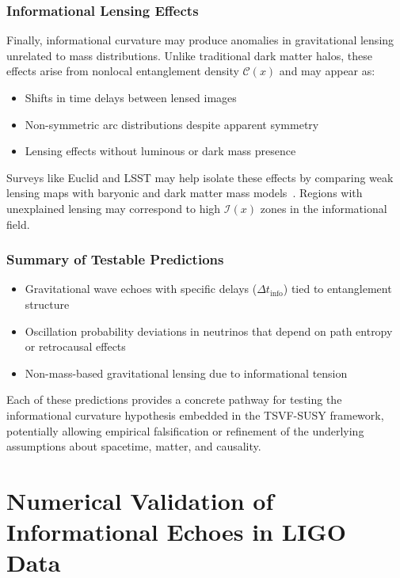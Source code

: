 \documentclass[twocolumn,superscriptaddress,floatfix]{revtex4-2}
\begin{document}
\subsubsection{Informational Lensing Effects}

Finally, informational curvature may produce anomalies in gravitational lensing unrelated to mass distributions. Unlike traditional dark matter halos, these effects arise from nonlocal entanglement density $\mathcal{C}(x)$ and may appear as:
\begin{itemize}
    \item Shifts in time delays between lensed images
    \item Non-symmetric arc distributions despite apparent symmetry
    \item Lensing effects without luminous or dark mass presence
\end{itemize}

Surveys like Euclid and LSST may help isolate these effects by comparing weak lensing maps with baryonic and dark matter mass models~\cite{LSST2009, Euclid2011}. Regions with unexplained lensing may correspond to high $\mathcal{I}(x)$ zones in the informational field.

\subsubsection{Summary of Testable Predictions}

\begin{itemize}
    \item Gravitational wave echoes with specific delays ($\Delta t_{\text{info}}$) tied to entanglement structure
    \item Oscillation probability deviations in neutrinos that depend on path entropy or retrocausal effects
    \item Non-mass-based gravitational lensing due to informational tension
\end{itemize}

Each of these predictions provides a concrete pathway for testing the informational curvature hypothesis embedded in the TSVF-SUSY framework, potentially allowing empirical falsification or refinement of the underlying assumptions about spacetime, matter, and causality.

\section{Numerical Validation of Informational Echoes in LIGO Data}
\label{sec:ligo_echo_validation}
\end{document}
